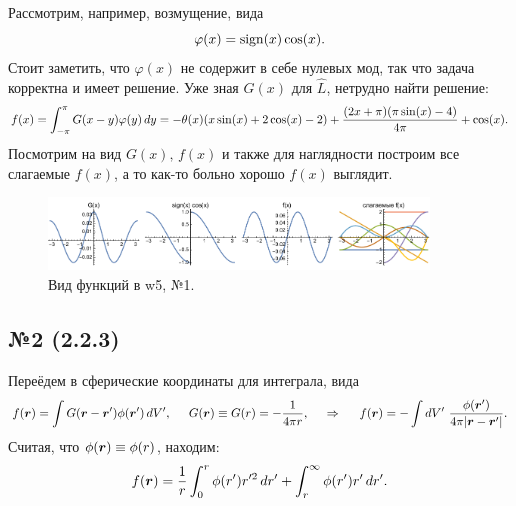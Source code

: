 Рассмотрим, например, возмущение, вида
\begin{equation*}
    \varphi(x) = \mathop{\mathrm{sign}}\nolimits(x) \cos (x).
\end{equation*}
Стоит заметить, что $\varphi(x)$ не содержит в себе нулевых мод, так что задача корректна и имеет решение. 
Уже зная $G(x)$ для $\hat{L}$, нетрудно найти решение:
\begin{equation*}
    f(x) = \int_{-\pi}^{\pi} G(x-y) \varphi(y) \, d y = 
    -\theta (x) (x \sin (x)+2 \cos (x)-2)+\frac{(2 x+\pi ) (\pi  \sin (x)-4)}{4 \pi }+\cos (x).
\end{equation*}
Посмотрим на вид $G(x),\, f(x)$ и также для наглядности построим все слагаемые $f(x)$, а то как-то больно хорошо $f(x)$ выглядит.
\begin{figure}[ht]
    \centering
    \includegraphics[width=0.9\textwidth]{figures/w5_1.pdf}
    \caption{Вид функций в w5, №1.}
\end{figure}


\subsection*{№2 (2.2.3)}


Переёдем в сферические координаты для интеграла, вида
\begin{equation*}
    f(\mbox{\boldmath $r$}) = \int G(\mbox{\boldmath $r$} - \mbox{\boldmath $r$}') \phi(\mbox{\boldmath $r$}') \, d V',
    \hspace{5 mm} 
    G(\mbox{\boldmath $r$}) \equiv G(r) = - \frac{1}{4 \pi r},
    \hspace{0.5cm} \Rightarrow \hspace{0.5cm}
    f(\mbox{\boldmath $r$}) = - \int dV'\ \frac{\phi(\mbox{\boldmath $r$}')}{4 \pi |\mbox{\boldmath $r$}-\mbox{\boldmath $r$}'|}.
\end{equation*}
Считая, что $\phi(\mbox{\boldmath $r$}) \equiv \phi(r)$, находим:
\begin{equation*}
    f(\mbox{\boldmath $r$}) = \frac{1}{r} \int_0^r \phi(r') r'^2 \, d r' + \int_r^\infty \phi (r') r' \, d r'.
\end{equation*}








